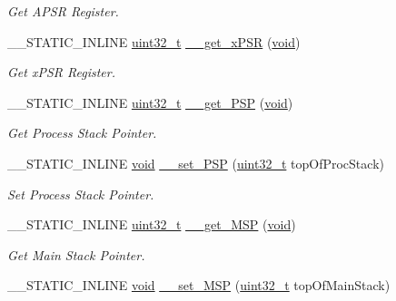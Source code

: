 \begin{DoxyCompactItemize}
\begin{DoxyCompactList}\small\item\em Get A\-P\-S\-R Register. \end{DoxyCompactList}\item 
\-\_\-\-\_\-\-S\-T\-A\-T\-I\-C\-\_\-\-I\-N\-L\-I\-N\-E \hyperlink{stdint_8h_a435d1572bf3f880d55459d9805097f62}{uint32\-\_\-t} \hyperlink{group___c_m_s_i_s___core___reg_acc_functions_ga94c675a736d4754a5f73d8748b24aa11}{\-\_\-\-\_\-get\-\_\-x\-P\-S\-R} (\hyperlink{group___n_a_m_e_ga18028b8badbf1ea7e704ccac3c488e82}{void})
\begin{DoxyCompactList}\small\item\em Get x\-P\-S\-R Register. \end{DoxyCompactList}\item 
\-\_\-\-\_\-\-S\-T\-A\-T\-I\-C\-\_\-\-I\-N\-L\-I\-N\-E \hyperlink{stdint_8h_a435d1572bf3f880d55459d9805097f62}{uint32\-\_\-t} \hyperlink{group___c_m_s_i_s___core___reg_acc_functions_ga914dfa8eff7ca53380dd54cf1d8bebd9}{\-\_\-\-\_\-get\-\_\-\-P\-S\-P} (\hyperlink{group___n_a_m_e_ga18028b8badbf1ea7e704ccac3c488e82}{void})
\begin{DoxyCompactList}\small\item\em Get Process Stack Pointer. \end{DoxyCompactList}\item 
\-\_\-\-\_\-\-S\-T\-A\-T\-I\-C\-\_\-\-I\-N\-L\-I\-N\-E \hyperlink{group___n_a_m_e_ga18028b8badbf1ea7e704ccac3c488e82}{void} \hyperlink{group___c_m_s_i_s___core___reg_acc_functions_ga48e5853f417e17a8a65080f6a605b743}{\-\_\-\-\_\-set\-\_\-\-P\-S\-P} (\hyperlink{stdint_8h_a435d1572bf3f880d55459d9805097f62}{uint32\-\_\-t} top\-Of\-Proc\-Stack)
\begin{DoxyCompactList}\small\item\em Set Process Stack Pointer. \end{DoxyCompactList}\item 
\-\_\-\-\_\-\-S\-T\-A\-T\-I\-C\-\_\-\-I\-N\-L\-I\-N\-E \hyperlink{stdint_8h_a435d1572bf3f880d55459d9805097f62}{uint32\-\_\-t} \hyperlink{group___c_m_s_i_s___core___reg_acc_functions_gab898559392ba027814e5bbb5a98b38d2}{\-\_\-\-\_\-get\-\_\-\-M\-S\-P} (\hyperlink{group___n_a_m_e_ga18028b8badbf1ea7e704ccac3c488e82}{void})
\begin{DoxyCompactList}\small\item\em Get Main Stack Pointer. \end{DoxyCompactList}\item 
\-\_\-\-\_\-\-S\-T\-A\-T\-I\-C\-\_\-\-I\-N\-L\-I\-N\-E \hyperlink{group___n_a_m_e_ga18028b8badbf1ea7e704ccac3c488e82}{void} \hyperlink{group___c_m_s_i_s___core___reg_acc_functions_ga0bf9564ebc1613a8faba014275dac2a4}{\-\_\-\-\_\-set\-\_\-\-M\-S\-P} (\hyperlink{stdint_8h_a435d1572bf3f880d55459d9805097f62}{uint32\-\_\-t} top\-Of\-Main\-Stack)

\end{DoxyCompactItemize}
